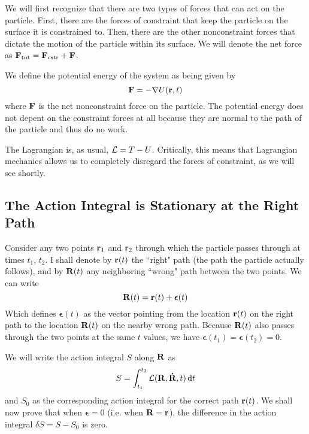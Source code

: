 We will first recognize that there are two types of forces that can act on the particle. First, there are the forces of constraint that keep the particle on the surface it is constrained to. Then, there are the other nonconstraint forces that dictate the motion of the particle within its surface. We will denote the net force as $\mathbf{F}_\text{tot} = \mathbf{F}_\text{cstr} + \mathbf{F}$.

We define the potential energy of the system as being given by
\[ \mathbf{F} = -\nabla U(\mathbf{r}, t) \]
where $\mathbf{F}$ is the net nonconstraint force on the particle. The potential energy does not depent on the constraint forces at all because they are normal to the path of the particle and thus do no work.

The Lagrangian is, as usual, $\mathcal{L} = T - U$. Critically, this means that Lagrangian mechanics allows us to completely disregard the forces of constraint, as we will see shortly.
\subsection*{The Action Integral is Stationary at the Right Path}
Consider any two points $\mathbf{r}_1$ and $\mathbf{r}_2$ through which the particle passes through at times $t_1$, $t_2$. I shall denote by $\mathbf{r}(t)$ the ``right" path (the path the particle actually follows), and by $\mathbf{R}(t)$ any neighboring ``wrong" path between the two points. We can write
\[ \mathbf{R}(t) = \mathbf{r}(t) + \boldsymbol{\epsilon}(t) \]
Which defines $\boldsymbol{\epsilon}(t)$ as the vector pointing from the location $\mathbf{r}(t)$ on the right path to the location $\mathbf{R}(t)$ on the nearby wrong path. Because $\mathbf{R}(t)$ also passes through the two points at the same $t$ values, we have $\boldsymbol{\epsilon}(t_1) = \boldsymbol{\epsilon}(t_2) = 0$. 

We will write the action integral $S$ along $\mathbf{R}$ as
\[ S = \int_{t_1}^{t_2} \mathcal{L}(\mathbf{R}, \mathbf{\dot R}, t)\, \dd t\]
and $S_0$ as the corresponding action integral for the correct path $\mathbf{r}(t)$. We shall now prove that when $\boldsymbol{\epsilon} = 0$ (i.e. when $\mathbf{R} = \mathbf{r}$), the difference in the action integral $\delta S = S - S_0$ is zero.

